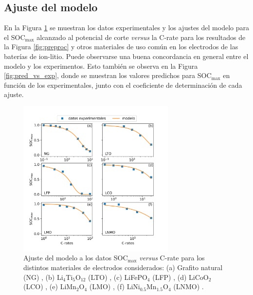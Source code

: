 \subsection{Ajuste del modelo}\label{s:ajustes}

En la Figura \ref{fig:ajustes} se muestran los datos experimentales y los 
ajustes del modelo para el SOC$_{\max}$ alcanzado al potencial de corte 
\textit{versus} la C-rate para los resultados de la Figura \ref{fig:preproc}
y otros materiales de uso común en los electrodos de las baterías de ion-litio.
Puede observarse una buena concordancia en general entre el modelo y los 
experimentos. Esto también se observa en la Figura \ref{fig:pred_vs_exp},
donde se muestran los valores predichos para SOC$_{\max}$ en función de los
experimentales, junto con el coeficiente de determinación de cada ajuste.
\begin{figure}[h!]
    \centering
    \includegraphics[width=0.7\textwidth]{FastCharging/un/resultados/ajuste/ajustes.png}
    \caption{Ajuste del modelo a los datos SOC$_{\max}$ \textit{versus} C-rate
    para los distintos materiales de electrodos considerados: (a) Grafito natural (NG)
    \cite{mancini2022}, (b) Li$_4$Ti$_5$O$_{12}$ (LTO) \cite{he2012}, (c) LiFePO$_4$ (LFP) \cite{lei2015}, 
    (d) LiCoO$_2$ (LCO) \cite{wang2019high}, (e) LiMn$_2$O$_4$ (LMO) \cite{bak2011}, (f) LiNi$_{0.5}$Mn$_{1.5}$O$_4$ (LNMO)
    \cite{nishikawa2017}.}
    \label{fig:ajustes}
\end{figure}
